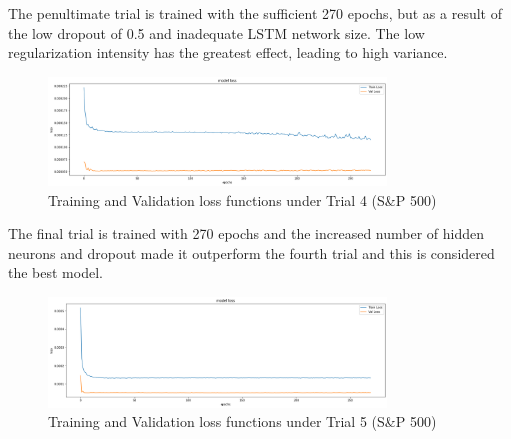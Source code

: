 \documentclass[a4paper,11pt,oneside]{book}
\begin{document}
The penultimate trial is trained with the sufficient 270 epochs, but as a result of the low dropout of 0.5 and inadequate LSTM
network size. The low regularization intensity has the greatest effect, leading to high variance.\newline
\begin{figure}[!h]
	\centering
	\includegraphics[width=0.8\textwidth]{figures/sanp4}
	\caption{Training and Validation loss functions under Trial 4 (S\&P 500)}
	\label{sanp4}
\end{figure}
\newline The final trial is trained with 270 epochs and the increased number of hidden neurons and dropout made it outperform the fourth trial and this is considered the best model.
\begin{figure}[!h]
	\centering
	\includegraphics[width=0.8\textwidth]{figures/sanp5}
	\caption{Training and Validation loss functions under Trial 5 (S\&P 500)}
	\label{sanp5}
\end{figure}






\end{document}
